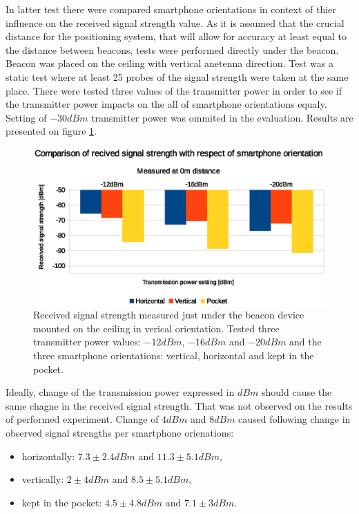\documentclass[../main.tex]{subfiles}
\begin{document}
In latter test there were compared smartphone orientations in context of thier influence on the received signal strength value. As it is assumed that the crucial distance for the positioning system, that will allow for accuracy at least equal to the distance between beacons, tests were performed directly under the beacon. Beacon was placed on the ceiling with vertical anetenna direction. Test was a static test where at least 25 probes of the signal strength were taken at the same place. There were tested three values of the transmitter power in order to see if the transmitter power impacts on the all of smartphone orientations equaly. Setting of $-30dBm$ transmitter power was ommited in the evaluation. Results are presented on figure \ref{fig:tests_case3_rssi_vs_smartphone_orientation}.

\begin{figure}[ht]
\includegraphics[width=\textwidth, keepaspectratio]{pictures/tests_case3_rssi_vs_smartphone_orientation}
\centering
\caption{Received signal strength measured just under the beacon device mounted on the ceiling in verical orientation. Tested three transmitter power values: $-12dBm$, $-16dBm$ and $-20dBm$ and the three smartphone orientations: vertical, horizontal and kept in the pocket.}
\label{fig:tests_case3_rssi_vs_smartphone_orientation}
\end{figure}

Ideally, change of the transmission power expressed in $dBm$ should cause the same chagne in the received signal strength. That was not observed on the results of performed experiment. Change of $4 dBm$ and $8 dBm$ caused following change in observed signal strengths per smartphone orienations:
\begin{itemize}
	\item horizontally: $7.3\pm2.4 dBm$ and $11.3\pm5.1 dBm$,
	\item vertically: $2\pm4 dBm$ and $8.5\pm5.1 dBm$,
	\item kept in the pocket: $4.5\pm4.8 dBm$ and $7.1\pm3 dBm$.
\end{itemize}
\end{document}
